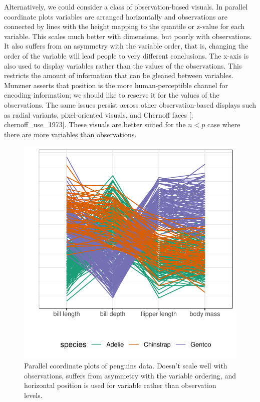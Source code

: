 \documentclass{template/monashthesis}
\begin{document}
Alternatively, we could consider a class of observation-based visuals. In parallel coordinate plots \autocite{ocagne_coordonnees_1885} variables are arranged horizontally and observations are connected by lines with the height mapping to the quantile or z-value for each variable. This scales much better with dimensions, but poorly with observations. It also suffers from an asymmetry with the variable order, that is, changing the order of the variable will lead people to very different conclusions. The x-axis is also used to display variables rather than the values of the observations. This restricts the amount of information that can be gleaned between variables. Munzner asserts that position is the more human-perceptible channel for encoding information; we should like to reserve it for the values of the observations. The same issues persist across other observation-based displays such as radial variants, pixel-oriented visuals, and Chernoff faces {[}\textcite{keim_designing_2000}; chernoff\_use\_1973{]}. These visuals are better suited for the \(n<p\) case where there are more variables than observations.



\begin{figure}

{\centering \includegraphics[width=1\linewidth,]{./figures_from_script/ch2_fig2_penguin_pcp} 

}

\caption{Parallel coordinate plots of penguins data. Doesn't scale well with observations, suffers from asymmetry with the variable ordering, and horizontal position is used for variable rather than observation levels.}\label{fig:penguinpcp}
\end{figure}
\end{document}

